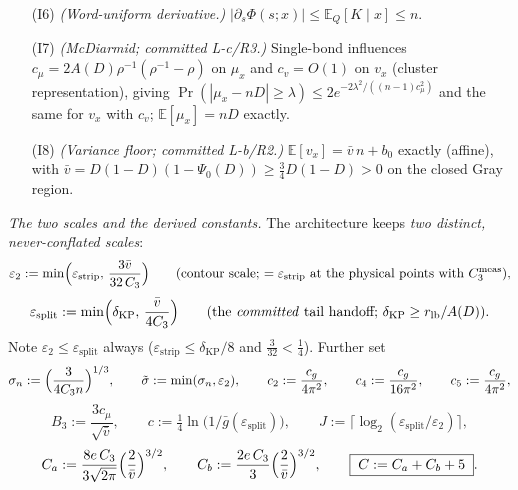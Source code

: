 \documentclass[
]{article}
\begin{document}
\begin{itemize}
{inequality, quantitative form of the tail-lemma mechanism.)}  With
$c_g:=\tfrac{11}{16}D(1-D)$,
\[
  \tag{I5}
  \mathbb E_x\bigl|\Phi(s;x)\bigr|^2\;\le\;C_1\,g(s)^{\,n-1}
  \;\le\;C_1\,e^{-c_g(1-\cos s)(n-1)}
  \;\le\;C_1\,e^{-\frac{c_g}{\pi^2}\,n s^2}\quad(n\ge2),
\]
the last step by Jordan's inequality $1-\cos s\ge\tfrac{2}{\pi^2}s^2$ on
$[0,\pi]$ and $n-1\ge n/2$.
\item[(I6)] \emph{(Word-uniform derivative.)}  $|\partial_s\Phi(s;x)|
\le\mathbb E_Q[K\mid x]\le n$.
\item[(I7)] \emph{(McDiarmid; committed L-c/R3.)}  Single-bond
influences $c_\mu=2A(D)\rho^{-1}(\rho^{-1}-\rho)$ on $\mu_x$ and
$c_v=O(1)$ on $v_x$ (cluster representation), giving
$\Pr(|\mu_x-nD|\ge\lambda)\le2e^{-2\lambda^2/((n-1)c_\mu^2)}$ and the
same for $v_x$ with $c_v$; $\mathbb E[\mu_x]=nD$ exactly.
\item[(I8)] \emph{(Variance floor; committed L-b/R2.)}
$\mathbb E[v_x]=\bar v\,n+b_0$ exactly (affine), with
$\bar v=D(1-D)(1-\Psi_0(D))\ge\tfrac34D(1-D)>0$ on the closed Gray
region.
\end{itemize}

\emph{The two scales and the derived constants.}
The architecture keeps \emph{two distinct, never-conflated scales}:
\[
  \varepsilon_2:=\min\Bigl(\varepsilon_{\mathrm{strip}},\,
  \frac{3\bar v}{32\,C_3}\Bigr)
  \qquad\text{(contour scale; $=\varepsilon_{\mathrm{strip}}$ at the
  physical points with $C_3^{\mathrm{meas}}$)},
\]
\[
  \varepsilon_{\mathrm{split}}:=\min\Bigl(\delta_{\mathrm{KP}},\,
  \frac{\bar v}{4C_3}\Bigr)
  \qquad\text{(the \emph{committed} tail handoff;
  $\delta_{\mathrm{KP}}\ge r_{\mathrm{lb}}/A(D)$)} .
\]
Note $\varepsilon_2\le\varepsilon_{\mathrm{split}}$ always
($\varepsilon_{\mathrm{strip}}\le\delta_{\mathrm{KP}}/8$ and
$\tfrac{3}{32}<\tfrac14$).  Further set
\[
  \sigma_n:=\Bigl(\frac{3}{4C_3 n}\Bigr)^{1/3},\qquad
  \tilde\sigma:=\min(\sigma_n,\varepsilon_2),\qquad
  c_2:=\frac{c_g}{4\pi^2},\qquad
  c_4:=\frac{c_g}{16\pi^2},\qquad
  c_5:=\frac{c_g}{4\pi^2},
\]
\[
  B_3:=\frac{3c_\mu}{\sqrt{\bar v}},\qquad
  c:=\tfrac14\ln\bigl(1/\bar g(\varepsilon_{\mathrm{split}})\bigr),\qquad
  J:=\bigl\lceil\log_2(\varepsilon_{\mathrm{split}}/\varepsilon_2)
  \bigr\rceil ,
\]
\[
  C_a:=\frac{8e\,C_3}{3\sqrt{2\pi}}\Bigl(\frac{2}{\bar v}\Bigr)^{3/2},
  \qquad
  C_b:=\frac{2e\,C_3}{3}\Bigl(\frac{2}{\bar v}\Bigr)^{3/2},\qquad
  \boxed{\;C:=C_a+C_b+5\;}.
\]
\end{document}
